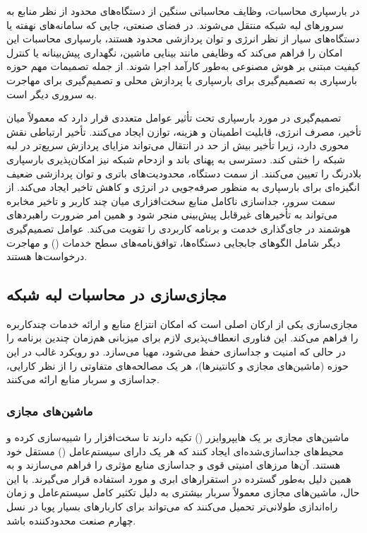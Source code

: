 در بارسپاری محاسبات، وظایف محاسباتی سنگین از دستگاه‌های محدود از نظر منابع به سرورهای لبه شبکه منتقل می‌شوند. در فضای صنعتی، جایی که سامانه‌های نهفته یا دستگاه‌های سیار از نظر انرژی و توان پردازشی محدود هستند، بارسپاری محاسبات این امکان را فراهم می‌کند که وظایفی مانند بینایی ماشین، نگهداری پیش‌بینانه یا کنترل کیفیت مبتنی بر هوش مصنوعی به‌طور کارآمد اجرا شوند. از جمله تصمیمات مهم حوزه بارسپاری به تصمیم‌گیری برای بارسپاری یا پردازش محلی و تصمیم‌گیری برای مهاجرت به سرور‌ی دیگر است.

تصمیم‌گیری در مورد بارسپاری تحت تأثیر عوامل متعددی قرار دارد که معمولاً میان تأخیر، مصرف انرژی، قابلیت اطمینان و هزینه، توازن ایجاد می‌کنند. تأخیر ارتباطی نقش محوری دارد، زیرا تأخیر بیش از حد در انتقال می‌تواند مزایای پردازش سریع‌تر در لبه شبکه را خنثی کند. دسترسی به پهنای باند و ازدحام شبکه نیز امکان‌پذیری بارسپاری بلادرنگ را تعیین می‌کنند. از سمت دستگاه، محدودیت‌های باتری و توان پردازشی ضعیف انگیزه‌ای برای بارسپاری به ‌منظور صرفه‌جویی در انرژی و کاهش تاخیر ایجاد می‌کند. از سمت سرور، جداسازی ناکامل منابع سخت‌افزاری میان چند کاربر و تاخیر مخابره می‌تواند به تأخیرهای غیرقابل پیش‌بینی منجر شود و همین امر ضرورت راهبردهای هوشمند در جای‌گذاری خدمت و برنامه کاربردی را تقویت می‌کند. عوامل تصمیم‌گیری دیگر شامل الگوهای جابجایی دستگاه‌ها، توافق‌نامه‌های سطح خدمات () و مهاجرت درخواست‌ها هستند.

\subsection{مجازی‌سازی در محاسبات لبه شبکه}

مجازی‌سازی یکی از ارکان اصلی  است که امکان انتزاع منابع و ارائه خدمات چندکاربره را فراهم می‌کند. این فناوری انعطاف‌پذیری لازم برای میزبانی هم‌زمان چندین برنامه را در حالی که امنیت و جداسازی حفظ می‌شود، مهیا می‌سازد. دو رویکرد غالب در این حوزه (ماشین‌های مجازی‌ و کانتینرها)، هر یک مصالحه‌های متفاوتی را از نظر کارایی، جداسازی و سربار منابع ارائه می‌کنند.

\subsubsection{ماشین‌های مجازی}

ماشین‌های مجازی بر یک هایپروایزر () تکیه دارند تا سخت‌افزار را شبیه‌سازی کرده و محیط‌های جداسازی‌شده‌ای ایجاد کنند که هر یک دارای سیستم‌عامل () مستقل خود هستند. آن‌ها مرزهای امنیتی قوی و جداسازی منابع مؤثری را فراهم می‌سازند و به همین دلیل به‌طور گسترده در استقرارهای ابری و  مورد استفاده قرار می‌گیرند. با این حال، ماشین‌های مجازی معمولاً سربار بیشتری به دلیل تکثیر کامل سیستم‌عامل و زمان راه‌اندازی طولانی‌تر تحمیل می‌کنند که می‌تواند برای کاربارهای بسیار پویا در نسل چهارم صنعت محدودکننده باشد.

